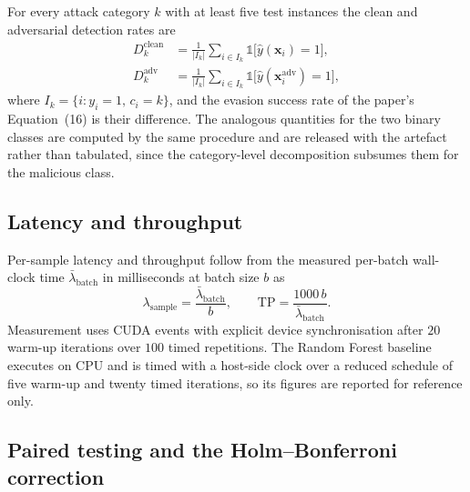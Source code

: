 \documentclass[11pt,a4paper]{article}
\newcommand{\Ind}{\mathbb{1}}
\newcommand{\vx}{\bm{x}}
\begin{document}
For every attack category $k$ with at least five test instances the
clean and adversarial detection rates are
\begin{align}
D_{k}^{\mathrm{clean}}&=\frac{1}{|I_{k}|}\sum_{i\in I_{k}}
\Ind\bigl[\hat{y}(\vx_{i})=1\bigr],
\label{eq:detrate-clean}\\
D_{k}^{\mathrm{adv}}&=\frac{1}{|I_{k}|}\sum_{i\in I_{k}}
\Ind\bigl[\hat{y}(\vx^{\mathrm{adv}}_{i})=1\bigr],
\label{eq:detrate-adv}
\end{align}
where $I_{k}=\{i: y_{i}=1,\,c_{i}=k\}$, and the evasion success rate of
the paper's Equation~(16) is their difference. The analogous
quantities for the two binary classes are computed by the same
procedure and are released with the artefact rather than tabulated,
since the category-level decomposition subsumes them for the malicious
class.

\subsection{Latency and throughput}

Per-sample latency and throughput follow from the measured per-batch
wall-clock time $\bar{\lambda}_{\mathrm{batch}}$ in milliseconds at
batch size $b$ as
\begin{equation}
\lambda_{\mathrm{sample}}=\frac{\bar{\lambda}_{\mathrm{batch}}}{b},
\qquad
\mathrm{TP}=\frac{1000\,b}{\bar{\lambda}_{\mathrm{batch}}} .
\label{eq:latency}
\end{equation}
Measurement uses CUDA events with explicit device synchronisation after
$20$ warm-up iterations over $100$ timed repetitions. The Random Forest
baseline executes on CPU and is timed with a host-side clock over a
reduced schedule of five warm-up and twenty timed iterations, so its
figures are reported for reference only.

\subsection{Paired testing and the Holm--Bonferroni correction}
\end{document}
